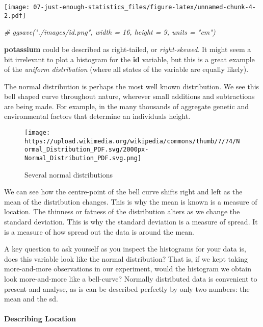 \documentclass[
]{article}
\newenvironment{Shaded}{\begin{snugshade}}{\end{snugshade}}
\newcommand{\CommentTok}[1]{\textcolor[rgb]{0.56,0.35,0.01}{\textit{#1}}}
\begin{document}
\texttt{[image: 07-just-enough-statistics\_files/figure-latex/unnamed-chunk-4-2.pdf]}

\begin{Shaded}
\begin{Highlighting}[]
\CommentTok{\# ggsave("./images/id.png", width = 16, height = 9, units = "cm")}
\end{Highlighting}
\end{Shaded}

\textbf{potassium} could be described as right-tailed, or
\emph{right-skewed}. It might seem a bit irrelevant to plot a histogram
for the \textbf{id} variable, but this is a great example of the
\emph{uniform distribution} (where all states of the variable are
equally likely).

The normal distribution is perhaps the most well known distribution. We
see this bell shaped curve throughout nature, wherever small additions
and subtractions are being made. For example, in the many thousands of
aggregate genetic and environmental factors that determine an
individuals height.

\begin{figure}
\centering
\texttt{[image: https://upload.wikimedia.org/wikipedia/commons/thumb/7/74/Normal\_Distribution\_PDF.svg/2000px-Normal\_Distribution\_PDF.svg.png]}
\caption{Several normal distributions}
\end{figure}

We can see how the centre-point of the bell curve shifts right and left
as the mean of the distribution changes. This is why the mean is known
is a measure of location. The thinness or fatness of the distribution
alters as we change the standard deviation. This is why the standard
deviation is a measure of spread. It is a measure of how spread out the
data is around the mean.

A key question to ask yourself as you inspect the histograms for your
data is, does this variable look like the normal distribution? That is,
if we kept taking more-and-more observations in our experiment, would
the histogram we obtain look more-and-more like a bell-curve? Normally
distributed data is convenient to present and analyse, as is can be
described perfectly by only two numbers: the mean and the sd.

\hypertarget{describing-location}{%
\paragraph{Describing Location}\label{describing-location}}
\end{document}
